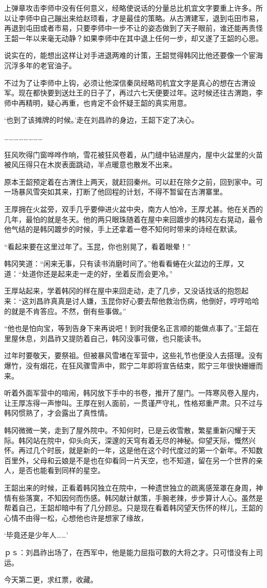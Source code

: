 上弹章攻击李师中没有任何意义，经略使说话的分量总比机宜文字要重上许多。所以让李师中自己蹦出来给赵顼看，才是最佳的策略。从古渭建军，退到屯田市易，再退到屯田或者市易，只要李师中一步不让的姿态做到了天子眼前，谁还能再责怪王韶一年以来毫无动静？如果李师中在其中退上任何一步，却又遂了王韶的心思。

说实在的，能想出这样让对手进退两难的计策，王韶觉得韩冈比他还要像一个宦海沉浮多年的老官油子。

不过为了让李师中上钩，必须让他深信秦凤经略司机宜文字是真心的想在古渭设军。现在都快要到送灶王的日子了，再过六七天便要过年。这时候还往古渭跑，李师中再精明，疑心再重，也肯定不会怀疑王韶的真实用意。

‘也到了该摊牌的时候。’走在刘昌祚的身边，王韶下定了决心。

……………………

狂风吹得门窗哗哗作响，雪花被狂风卷着，从门缝中钻进屋内，屋中火盆里的火苗被风压得只在木炭表面跳动，半点暖意也散发不出来。

原本王韶预定着在古渭住上两天，就赶回秦州。可以赶在除夕之前，回到家中。可一场暴风雪突如其来，打断了他回程的计划，不得不暂留在古渭寨里。

王厚拥在火盆旁，双手几乎要伸进火盆中央，南方人怕冷，王厚尤甚。他在关西的几年，最怕的就是冬天。他的两只眼珠随着在屋中来回踱步的韩冈左右晃动，最令他气结的是韩冈踱步的时候，手上还拿着一卷不知何时带来的诗经在默读。

“看起来要在这里过年了。玉昆，你也别晃了，看着眼晕！”

韩冈笑道：“闲来无事，只有读书消磨时间了。”他看看蜷在火盆边的王厚，又道：“处道你还是起来走一走的好，坐着反而会更冷。”

王厚站起来，学着韩冈的样在屋中来回走动，走了几步，又没话找话的抱怨起来：“这刘昌祚真真是讨人嫌，玉昆你好心要去帮他救治伤病，他倒好，哼哼哈哈的就是不肯答应。不然，倒有些事做。”

“他也是怕向宝，等到告身下来再说吧！到时我便名正言顺的能做点事了。”王韶在里屋休息，刘昌祚又提防着自己，韩冈没事可做，也只能读书。

过年时要敬天，要祭祖。但被暴风雪堵在军营中，这些礼节也便没人去搭理。没有爆竹，没有烟花，在狂风骤雪声中，熙宁二年即将宣告结束，熙宁三年很快姗姗而来。

听着外面军营中的喧闹，韩冈放下手中的书卷，推开了屋门。一阵寒风卷入屋内，让王厚冻得一声惨叫。王厚在别人面前，一贯谨严守礼，性格郑重严肃。只不过与韩冈惯熟了，才会露出了真性情。

韩冈微微一笑，走到了屋外院中。不知何时，已是云收雪散，繁星重新闪耀于天际。韩冈站在院中，仰头向天，深邃的天穹有着无尽的神秘。仰望天际，慨然兴怀。再过几个时辰，就是新的一年，这是他在这个时代度过的第一个新年。不知数百里外，父母和云娘是不是也在仰看同一片天空，也不知道，留在另一个世界的亲人，是否也能看到同样的星空。

王韶出来的时候，正看着韩冈独立在院中，一种遗世独立的疏离感笼罩在身周，神情有些落寞，不知因何而伤感。韩冈献计献策，手腕老辣，步步算计人心。虽然是帮着自己，王韶却暗中有了几分顾忌。只是现在看着韩冈望天伤怀的样儿，王韶的心情不由得一松，心想他也许是想家了缘故，

‘毕竟还是少年人……’

ｐｓ：刘昌祚出场了，在西军中，他是能力屈指可数的大将之才。只可惜没有上司运。

今天第二更，求红票，收藏。

